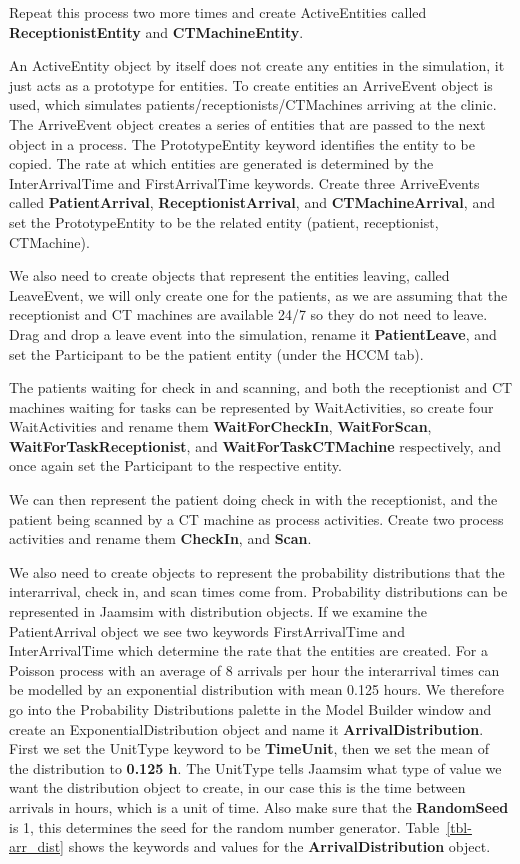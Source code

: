 \documentclass[
  10pt,
  a4paperpaper,
  DIV=11,
  numbers=noendperiod,
  oneside]{scrreprt}
\begin{document}
Repeat this process two more times and create ActiveEntities called
\textbf{ReceptionistEntity} and \textbf{CTMachineEntity}.

An ActiveEntity object by itself does not create any entities in the
simulation, it just acts as a prototype for entities. To create entities
an ArriveEvent object is used, which simulates
patients/receptionists/CTMachines arriving at the clinic. The
ArriveEvent object creates a series of entities that are passed to the
next object in a process. The PrototypeEntity keyword identifies the
entity to be copied. The rate at which entities are generated is
determined by the InterArrivalTime and FirstArrivalTime keywords. Create
three ArriveEvents called \textbf{PatientArrival},
\textbf{ReceptionistArrival}, and \textbf{CTMachineArrival}, and set the
PrototypeEntity to be the related entity (patient, receptionist,
CTMachine).

We also need to create objects that represent the entities leaving,
called LeaveEvent, we will only create one for the patients, as we are
assuming that the receptionist and CT machines are available 24/7 so
they do not need to leave. Drag and drop a leave event into the
simulation, rename it \textbf{PatientLeave}, and set the Participant to
be the patient entity (under the HCCM tab).

The patients waiting for check in and scanning, and both the
receptionist and CT machines waiting for tasks can be represented by
WaitActivities, so create four WaitActivities and rename them
\textbf{WaitForCheckIn}, \textbf{WaitForScan},
\textbf{WaitForTaskReceptionist}, and \textbf{WaitForTaskCTMachine}
respectively, and once again set the Participant to the respective
entity.

We can then represent the patient doing check in with the receptionist,
and the patient being scanned by a CT machine as process activities.
Create two process activities and rename them \textbf{CheckIn}, and
\textbf{Scan}.

We also need to create objects to represent the probability
distributions that the interarrival, check in, and scan times come from.
Probability distributions can be represented in Jaamsim with
distribution objects. If we examine the PatientArrival object we see two
keywords FirstArrivalTime and InterArrivalTime which determine the rate
that the entities are created. For a Poisson process with an average of
8 arrivals per hour the interarrival times can be modelled by an
exponential distribution with mean 0.125 hours. We therefore go into the
Probability Distributions palette in the Model Builder window and create
an ExponentialDistribution object and name it
\textbf{ArrivalDistribution}. First we set the UnitType keyword to be
\textbf{TimeUnit}, then we set the mean of the distribution to
\textbf{0.125 h}. The UnitType tells Jaamsim what type of value we want
the distribution object to create, in our case this is the time between
arrivals in hours, which is a unit of time. Also make sure that the
\textbf{RandomSeed} is 1, this determines the seed for the random number
generator. Table~\ref{tbl-arr_dist} shows the keywords and values for
the \textbf{ArrivalDistribution} object.
\end{document}
